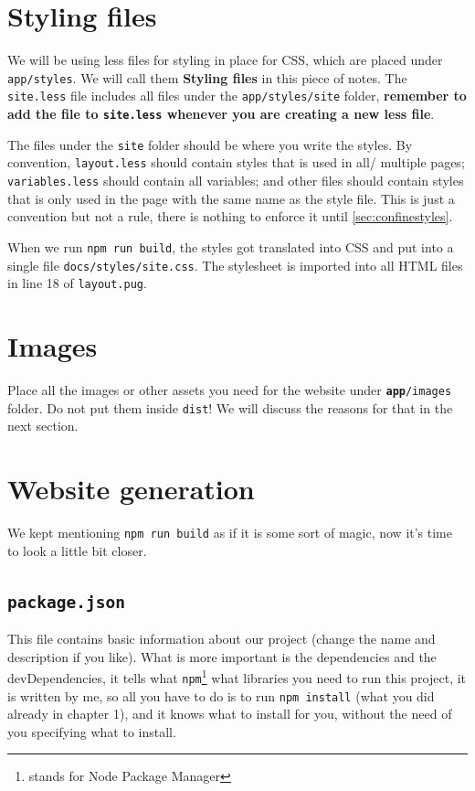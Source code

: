 \section{Styling files}

We will be using less files for styling in place for CSS, which are placed under \texttt{app/styles}. We will call them \textbf{Styling files} in this piece of notes. The \texttt{site.less} file includes all files under the \texttt{app/styles/site} folder, \textbf{remember to add the file to \texttt{site.less} whenever you are creating a new less file}. 

The files under the \texttt{site} folder should be where you write the styles. By convention, \texttt{layout.less} should contain styles that is used in all/ multiple pages; \texttt{variables.less} should contain all variables; and other files should contain styles that is only used in the page with the same name as the style file. This is just a convention but not a rule, there is nothing to enforce it until \cref{sec:confinestyles}.

When we run \texttt{npm run build}, the styles got translated into CSS and put into a single file \texttt{docs/styles/site.css}. The stylesheet is imported into all HTML files in line 18 of \texttt{layout.pug}.

\section{Images}

Place all the images or other assets you need for the website under \texttt{\textbf{app}/images} folder. Do not put them inside \texttt{dist}! We will discuss the reasons for that in the next section. 

\section{Website generation}

We kept mentioning \texttt{npm run build} as if it is some sort of magic, now it's time to look a little bit closer.

\subsection{\texttt{package.json}}

This file contains basic information about our project (change the name and description if you like). What is more important is the dependencies and the devDependencies, it tells what \texttt{npm}\footnote{stands for Node Package Manager} what libraries you need to run this project, it is written by me, so all you have to do is to run \texttt{npm install} (what you did already in chapter 1), and it knows what to install for you, without the need of you specifying what to install.

